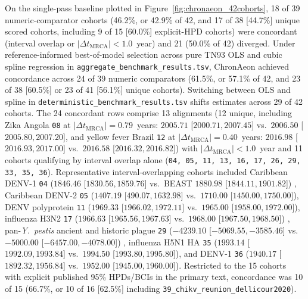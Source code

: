 \documentclass[11pt,letterpaper]{article}
\newcommand{\tool}[1]{\textsf{#1}}
\begin{document}
On the single-pass baseline plotted in Figure~\ref{fig:chronaeon_42cohorts}, 18 of 39 numeric-comparator cohorts (46.2\%, or 42.9\% of 42, and 17 of 38 [44.7\%] unique scored cohorts, including 9 of 15 [60.0\%] explicit-HPD cohorts) were concordant (interval overlap or $|\Delta t_{\mathrm{MRCA}}| < 1.0$~year) and 21 (50.0\% of 42) diverged. Under reference-informed best-of-model selection across pure TN93 OLS and cubic spline regression in \nolinkurl{aggregate_benchmark_results.tsv}, \tool{ChronAeon} achieved concordance across 24 of 39 numeric comparators (61.5\%, or 57.1\% of 42, and 23 of 38 [60.5\%] or 23 of 41 [56.1\%] unique cohorts). Switching between OLS and spline in \nolinkurl{deterministic_benchmark_results.tsv} shifts estimates across 29 of 42 cohorts. The 24 concordant rows comprise 13 alignments (12 unique, including Zika Angola \texttt{08} at $|\Delta t_{\mathrm{MRCA}}| = 0.79$~years: $2005.71$ [$2000.71, 2007.45$] vs.\ $2006.50$ [$2005.80, 2007.20$], and yellow fever Brazil \texttt{12} at $|\Delta t_{\mathrm{MRCA}}| = 0.40$~years: $2016.98$ [$2016.93, 2017.00$] vs.\ $2016.58$ [$2016.32, 2016.82$]) with $|\Delta t_{\mathrm{MRCA}}| < 1.0$~year and 11 cohorts qualifying by interval overlap alone (\texttt{04, 05, 11, 13, 16, 17, 26, 29, 33, 35, 36}). Representative interval-overlapping cohorts included Caribbean DENV-1 \texttt{04} ($1846.46$ [$1830.56, 1859.76$] vs.\ \tool{BEAST} $1880.98$ [$1844.11, 1901.82$]) \cite{taylorsalmon2024travel}, Caribbean DENV-2 \texttt{05} ($1407.19$ [$490.07, 1632.98$] vs.\ $1710.00$ [$1450.00, 1750.00$]), DENV polyprotein \texttt{11} ($1969.33$ [$1966.02, 1972.11$] vs.\ $1965.00$ [$1958.00, 1972.00$]), influenza H3N2 \texttt{17} ($1966.63$ [$1965.56, 1967.63$] vs.\ $1968.00$ [$1967.50, 1968.50$]) \cite{worobey2014flu}, pan-\textit{Y.\ pestis} ancient and historic plague \texttt{29} ($-4239.10$ [$-5069.55, -3585.46$] vs.\ $-5000.00$ [$-6457.00, -4078.00$]) \cite{spyrou2019plague}, influenza H5N1 HA \texttt{35} ($1993.14$ [$1992.09, 1993.84$] vs.\ $1994.50$ [$1993.80, 1995.80$]), and DENV-1 \texttt{36} ($1940.17$ [$1892.32, 1956.84$] vs.\ $1952.00$ [$1945.00, 1960.00$]). Restricted to the 15 cohorts with explicit published 95\% HPDs/BCIs in the primary text, concordance was 10 of 15 (66.7\%, or 10 of 16 [62.5\%] including \nolinkurl{39_chikv_reunion_dellicour2020}).
\end{document}
